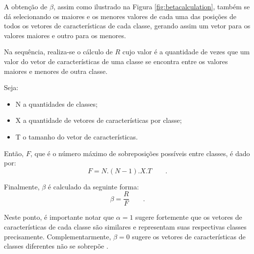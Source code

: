 				\par A obtenção de $\beta$, assim como ilustrado na Figura \ref{fig:betacalculation}, também se dá selecionando os maiores e os menores valores de cada uma das posições de todos os vetores de características de cada classe, gerando assim um vetor para os valores maiores e outro para os menores.
				
				\par Na sequência, realiza-se o cálculo de $R$ cujo valor é a quantidade de vezes que um valor do vetor de características de uma classe se encontra entre os valores maiores e menores de outra classe.
				
				\par Seja:
				\begin{itemize}
					\item N a quantidades de classes;
					\item X a quantidade de vetores de características por classe;
					\item T o tamanho do vetor de características.
				\end{itemize}
				
				\par Então, $F$, que é o número máximo de sobreposições possíveis entre classes, é dado por:
				\begin{equation}
						F=N.(N-1).X.T \qquad.
				\end{equation}
				\par Finalmente, $\beta$ é calculado da seguinte forma:
				\begin{equation}
					\beta=\dfrac{R}{F} \qquad.
				\end{equation}
			
				\par Neste ponto, é importante notar que $\alpha=1$ sugere fortemente que os vetores de características de cada classe são similares e representam suas respectivas classes precisamente. Complementarmente, $\beta=0$ sugere os vetores de características de classes diferentes não se sobrepõe \cite{8588433}.
				
